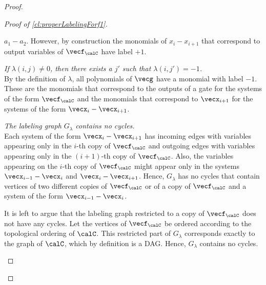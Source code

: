 \begin{proof}
\begin{proof}[Proof of \autoref{cl:properLabelingForf1}]
\begin{description}
              $a_1 - a_2$. However, by construction the monomials of $x_i - x_{i+1}$ that
              correspond to output variables of $\vecf_{\calC}$ have label $+1$.
        \item[Condition 5.] \emph{If $\lambda(i, j) \neq 0$, then there exists a $j'$ such
              that $\lambda(i, j') = -1$.} \\
              By the definition of $\lambda$, all polynomials of $\vecg$ have a monomial
              with label $-1$. These are the monomials that correspond to the outputs of
              a gate for the systems of the form $\vecf_{\calC}$ and the monomials
              that correspond to $\vecx_{i+1}$ for the systems of the form
              $\vecx_{i}- \vecx_{i+1}$.
        \item[Condition 6.] \emph{The labeling graph $G_{\lambda}$ contains no cycles.}\\
              Each system of the form $\vecx_i - \vecx_{i+1}$ has incoming
              edges with variables appearing only in the $i$-th copy of
              $\vecf_{\calC}$ and outgoing edges with variables
              appearing only in the $(i+1)$-th copy of $\vecf_{\calC}$. Also, the
              variables appearing on the $i$-th copy of $\vecf_{\calC}$ might
              appear only in the systems $\vecx_{i-1} - \vecx_i$ and
              $\vecx_i - \vecx_{i+1}$. Hence, $G_{\lambda}$ has no cycles that contain
              vertices of two different copies of $\vecf_{\calC}$ or of a copy of
              $\vecf_{\calC}$ and a system of the form $\vecx_{i-1} - \vecx_i$.

              It is left to argue that the labeling graph restricted to a copy of
              $\vecf_{\calC}$  does not have any cycles. Let the vertices of
              $\vecf_{\calC}$ be ordered according to the topological ordering of
              $\calC$. This restricted part of $G_{\lambda}$ corresponds exactly to
              the graph of $\calC$, which by definition is a DAG. Hence, $G_{\lambda}$
              contains no cycles.\qedhere
      \end{description}
\end{proof}


\end{proof}
